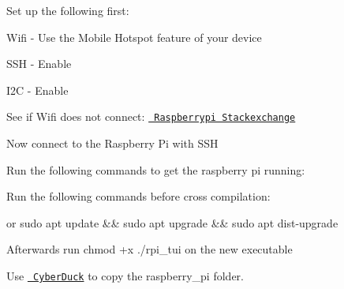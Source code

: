 Set up the following first\+:


\begin{DoxyItemize}
\item Wifi -\/ Use the Mobile Hotspot feature of your device
\item SSH -\/ Enable
\item I2C -\/ Enable
\end{DoxyItemize}

See if Wifi does not connect\+: \href{https://raspberrypi.stackexchange.com/questions/96736}{\texttt{ Raspberrypi Stackexchange}}

Now connect to the Raspberry Pi with SSH

Run the following commands to get the raspberry pi running\+: 
\begin{DoxyCode}{0}

\end{DoxyCode}


Run the following commands before cross compilation\+: 
\begin{DoxyCode}{0}

\end{DoxyCode}
 or {\ttfamily sudo apt update \&\& sudo apt upgrade \&\& sudo apt dist-\/upgrade}

Afterwards run {\ttfamily chmod +x ./rpi\+\_\+tui} on the new executable

Use \href{https://cyberduck.io/}{\texttt{ Cyber\+Duck}} to copy the raspberry\+\_\+pi folder. 